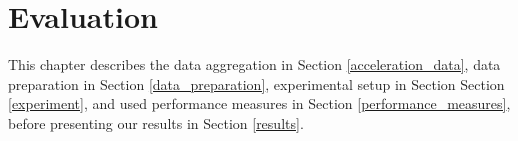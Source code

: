 \section{Evaluation} \label{evaluation}

This chapter describes the data aggregation in Section \ref{acceleration_data}, data preparation in Section \ref{data_preparation}, experimental setup in Section Section \ref{experiment}, and used performance measures in Section \ref{performance_measures}, before presenting our results in Section \ref{results}.






%

